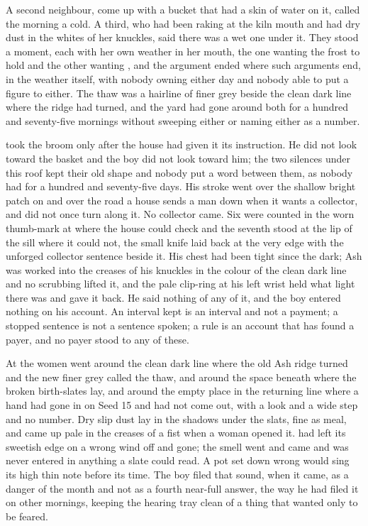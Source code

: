 A second neighbour, come up with a bucket that had a skin of water on it, called the morning a cold. A third, who had been raking at the kiln mouth and had dry dust in the whites of her knuckles, said there was a wet one under it. They stood a moment, each with her own weather in her mouth, the one wanting the frost to hold and the other wanting , and the argument ended where such arguments end, in the weather itself, with nobody owning either day and nobody able to put a figure to either. The thaw was a hairline of finer grey beside the clean dark line where the  ridge had turned, and the yard had gone around both for a hundred and seventy-five mornings without sweeping either or naming either as a number.

 took the broom only after the house had given it its instruction. He did not look toward the basket and the boy did not look toward him; the two silences under this roof kept their old shape and nobody put a word between them, as nobody had for a hundred and seventy-five days. His stroke went over the shallow bright patch on  and over the road a house sends a man down when it wants a collector, and did not once turn along it. No collector came. Six were counted in the worn thumb-mark at  where the house could check and the seventh stood at the lip of the sill where it could not, the small knife laid back at the very edge with the unforged collector sentence beside it. His chest had been tight since the dark; Ash was worked into the creases of his knuckles in the colour of the clean dark line and no scrubbing lifted it, and the pale clip-ring at his left wrist held what light there was and gave it back. He said nothing of any of it, and the boy entered nothing on his account. An interval kept is an interval and not a payment; a stopped sentence is not a sentence spoken; a rule is an account that has found a payer, and no payer stood to any of these.

\scenebreak

At  the women went around the clean dark line where the old Ash ridge turned and the new finer grey called the thaw, and around the space beneath  where the broken birth-slates lay, and around the empty place in the returning line where a hand had gone in on Seed 15 and had not come out, with a look and a wide step and no number. Dry slip dust lay in the shadows under the slats, fine as meal, and came up pale in the creases of a fist when a woman opened it.  had left its sweetish edge on a wrong wind off  and gone; the smell went and came and was never entered in anything a slate could read. A pot set down wrong would sing its high thin note before its time. The boy filed that sound, when it came, as a danger of the month and not as a fourth near-full answer, the way he had filed it on other mornings, keeping the hearing tray clean of a thing that wanted only to be feared.

